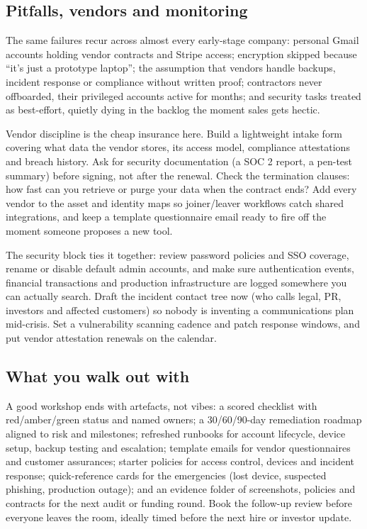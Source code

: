 \subsection{Pitfalls, vendors and monitoring}


The same failures recur across almost every early-stage company: personal Gmail accounts holding vendor contracts and Stripe access; encryption skipped because ``it's just a prototype laptop''; the assumption that vendors handle backups, incident response or compliance without written proof; contractors never offboarded, their privileged accounts active for months; and security tasks treated as best-effort, quietly dying in the backlog the moment sales gets hectic.


Vendor discipline is the cheap insurance here. Build a lightweight intake form covering what data the vendor stores, its access model, compliance attestations and breach history. Ask for security documentation (a SOC 2 report, a pen-test summary) before signing, not after the renewal. Check the termination clauses: how fast can you retrieve or purge your data when the contract ends? Add every vendor to the asset and identity maps so joiner/leaver workflows catch shared integrations, and keep a template questionnaire email ready to fire off the moment someone proposes a new tool.


The security block ties it together: review password policies and SSO coverage, rename or disable default admin accounts, and make sure authentication events, financial transactions and production infrastructure are logged somewhere you can actually search. Draft the incident contact tree now (who calls legal, PR, investors and affected customers) so nobody is inventing a communications plan mid-crisis. Set a vulnerability scanning cadence and patch response windows, and put vendor attestation renewals on the calendar.



\subsection{What you walk out with}


A good workshop ends with artefacts, not vibes: a scored checklist with red/amber/green status and named owners; a 30/60/90-day remediation roadmap aligned to risk and milestones; refreshed runbooks for account lifecycle, device setup, backup testing and escalation; template emails for vendor questionnaires and customer assurances; starter policies for access control, devices and incident response; quick-reference cards for the emergencies (lost device, suspected phishing, production outage); and an evidence folder of screenshots, policies and contracts for the next audit or funding round. Book the follow-up review before everyone leaves the room, ideally timed before the next hire or investor update.


